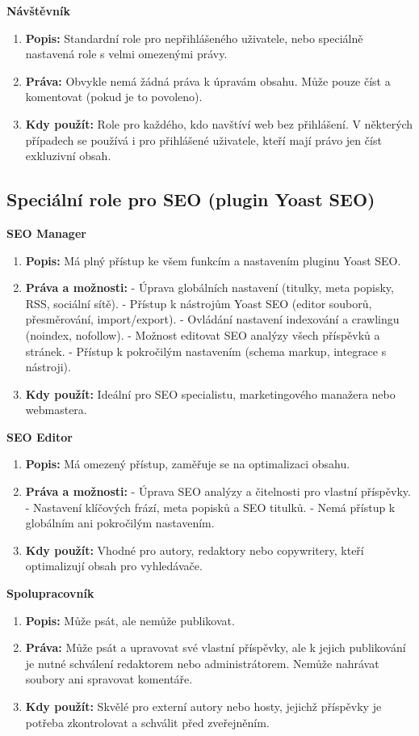 \documentclass[12pt,a4paper]{article}
\begin{document}
	\textbf{Návštěvník}
	\begin{enumerate}
	\item \textbf{Popis:} Standardní role pro nepřihlášeného uživatele, nebo speciálně nastavená role s velmi omezenými právy.
	\item \textbf{Práva:} Obvykle nemá žádná práva k úpravám obsahu. Může pouze číst a komentovat (pokud je to povoleno).
	\item \textbf{Kdy použít:} Role pro každého, kdo navštíví web bez přihlášení. V některých případech se používá i pro přihlášené uživatele, kteří mají právo jen číst exkluzivní obsah.
	\end{enumerate}
	
	\subsection{Speciální role pro SEO (plugin Yoast SEO)}
	
	\textbf{SEO Manager}
	\begin{enumerate}
	\item \textbf{Popis:} Má plný přístup ke všem funkcím a nastavením pluginu Yoast SEO.
	\item \textbf{Práva a možnosti:}  
	- Úprava globálních nastavení (titulky, meta popisky, RSS, sociální sítě).  
	- Přístup k nástrojům Yoast SEO (editor souborů, přesměrování, import/export).  
	- Ovládání nastavení indexování a crawlingu (noindex, nofollow).  
	- Možnost editovat SEO analýzy všech příspěvků a stránek.  
	- Přístup k pokročilým nastavením (schema markup, integrace s nástroji).
	\item \textbf{Kdy použít:} Ideální pro SEO specialistu, marketingového manažera nebo webmastera.
	\end{enumerate}
	
	\textbf{SEO Editor}
	\begin{enumerate}
	\item \textbf{Popis:} Má omezený přístup, zaměřuje se na optimalizaci obsahu.
	\item \textbf{Práva a možnosti:}  
	- Úprava SEO analýzy a čitelnosti pro vlastní příspěvky.  
	- Nastavení klíčových frází, meta popisků a SEO titulků.  
	- Nemá přístup k globálním ani pokročilým nastavením.
	\item \textbf{Kdy použít:} Vhodné pro autory, redaktory nebo copywritery, kteří optimalizují obsah pro vyhledávače.
	\end{enumerate}
	
	
	\textbf{Spolupracovník}
	\begin{enumerate}
		\item \textbf{Popis:} Může psát, ale nemůže publikovat.
		\item \textbf{Práva:} Může psát a upravovat své vlastní příspěvky, ale k jejich publikování je nutné schválení redaktorem nebo administrátorem. Nemůže nahrávat soubory ani spravovat komentáře.
		\item \textbf{Kdy použít:} Skvělé pro externí autory nebo hosty, jejichž příspěvky je potřeba zkontrolovat a schválit před zveřejněním.
	\end{enumerate}
	
\end{document}
